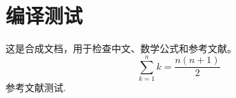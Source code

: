 \documentclass[fontset=fandol]{ctexart}
\begin{document}
\section{编译测试}
这是合成文档，用于检查中文、数学公式和参考文献。
\[
  \sum_{k=1}^{n} k = \frac{n(n+1)}{2}
\]
参考文献测试\cite{example}.
\printbibliography
\end{document}
